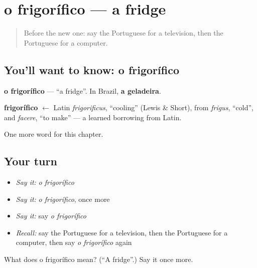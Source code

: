 \section[o frigorífico]{o frigorífico — a fridge}

\label{lesson:PT-C93-frigorifico}



\begin{quote}
Before the new one: say the Portuguese for a television, then the Portuguese for a computer.
\end{quote}

\subsection*{You'll want to know: o frigorífico}
\textbf{o frigorífico} — \textquotedblleft{}a fridge\textquotedblright{}. In Brazil, \textbf{a geladeira}.

\begin{cousinweb}
\textbf{frigorífico} $\leftarrow$ Latin \emph{frigorificus}, \textquotedblleft{}cooling\textquotedblright{} (Lewis \& Short), from \emph{frigus}, \textquotedblleft{}cold\textquotedblright{}, and \emph{facere}, \textquotedblleft{}to make\textquotedblright{} — a learned borrowing from Latin.
\end{cousinweb}

\begin{grammarlens}[title={What you've built}]
One more word for this chapter.
\end{grammarlens}

\subsection*{Your turn}
\begin{itemize}
\raggedright
  \item \emph{Say it:} \emph{o frigorífico}
  \item \emph{Say it:} \emph{o frigorífico}, once more
  \item \emph{Say it:} say \emph{o frigorífico}
  \item \emph{Recall:} say the Portuguese for a television, then the Portuguese for a computer, then say \emph{o frigorífico} again
\end{itemize}

\begin{tcolorbox}[breakable,colback=teal!4,colframe=teal!35!black,title={Before you move on}]
What does o frigorífico mean? (\textquotedblleft{}A fridge\textquotedblright{}.) Say it once more.
\end{tcolorbox}
